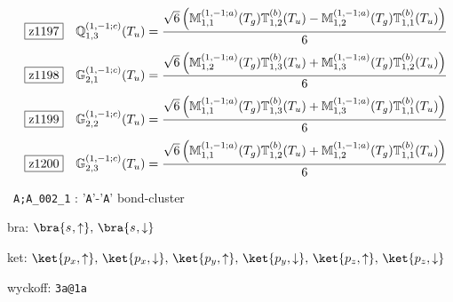 \documentclass[fleqn,10pt,landscape]{jsarticle}
\begin{document}
\begin{dmath*}
\hspace*{3mm}\fbox{z1197}\quad \mathbb{Q}_{1,3}^{(1,-1;c)}(T_{u})=\frac{\sqrt{6} \left(\mathbb{M}_{1,1}^{(1,-1;a)}(T_{g}) \mathbb{T}_{1,2}^{(b)}(T_{u}) - \mathbb{M}_{1,2}^{(1,-1;a)}(T_{g}) \mathbb{T}_{1,1}^{(b)}(T_{u})\right)}{6}
\end{dmath*}
\begin{dmath*}
\hspace*{3mm}\fbox{z1198}\quad \mathbb{G}_{2,1}^{(1,-1;c)}(T_{u})=\frac{\sqrt{6} \left(\mathbb{M}_{1,2}^{(1,-1;a)}(T_{g}) \mathbb{T}_{1,3}^{(b)}(T_{u}) + \mathbb{M}_{1,3}^{(1,-1;a)}(T_{g}) \mathbb{T}_{1,2}^{(b)}(T_{u})\right)}{6}
\end{dmath*}
\begin{dmath*}
\hspace*{3mm}\fbox{z1199}\quad \mathbb{G}_{2,2}^{(1,-1;c)}(T_{u})=\frac{\sqrt{6} \left(\mathbb{M}_{1,1}^{(1,-1;a)}(T_{g}) \mathbb{T}_{1,3}^{(b)}(T_{u}) + \mathbb{M}_{1,3}^{(1,-1;a)}(T_{g}) \mathbb{T}_{1,1}^{(b)}(T_{u})\right)}{6}
\end{dmath*}
\begin{dmath*}
\hspace*{3mm}\fbox{z1200}\quad \mathbb{G}_{2,3}^{(1,-1;c)}(T_{u})=\frac{\sqrt{6} \left(\mathbb{M}_{1,1}^{(1,-1;a)}(T_{g}) \mathbb{T}_{1,2}^{(b)}(T_{u}) + \mathbb{M}_{1,2}^{(1,-1;a)}(T_{g}) \mathbb{T}_{1,1}^{(b)}(T_{u})\right)}{6}
\end{dmath*}
\vspace{5mm}

\noindent\textbullet\, \texttt{A;A_002_1} : '\texttt{A}'-'\texttt{A}' bond-cluster

\noindent\quad * bra: $\bra{s_{},\uparrow},\, \bra{s_{},\downarrow}$

\noindent\quad * ket: $\ket{p_{x},\uparrow},\, \ket{p_{x},\downarrow},\, \ket{p_{y},\uparrow},\, \ket{p_{y},\downarrow},\, \ket{p_{z},\uparrow},\, \ket{p_{z},\downarrow}$

\noindent\quad * wyckoff: \texttt{3a@1a}
\end{document}
